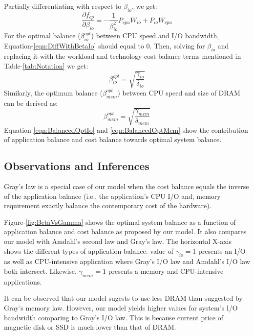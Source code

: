 \documentclass[journal]{IEEEtran}
\begin{document}
Partially differentiating with respect to $\beta_{io}$, we get:
\begin{equation} \label{eqn:DiffWithBetaIo}
\frac{\partial f_{cp}}{\partial \beta_{io}} = -\frac{1}{\beta_{io}^2}P_{cpu}W_{io} + P_{io}W_{cpu}
\end{equation}
For the optimal balance ($\beta_{io}^{opt}$) between CPU speed and I/O bandwidth, Equation-\ref{eqn:DiffWithBetaIo} should equal to $0$. Then,  solving for $\beta_{io}$ and replacing it with the workload and technology-cost balance terms mentioned in Table-\ref{tab:Notation} we get:
\begin{equation} \label{eqn:BalancedOptIo}
\beta^{opt}_{io} = \sqrt{\frac{\gamma_{io}}{\delta_{io}}}
\end{equation}
Similarly, the optimum balance ($\beta_{mem}^{opt}$) between CPU speed and size of DRAM can be derived as: 
\begin{equation} \label{eqn:BalancedOptMem}
\beta^{opt}_{mem} = \sqrt{\frac{\gamma_{mem}}{\delta_{mem}}}
\end{equation}
Equation-\ref{eqn:BalancedOptIo} and \ref{eqn:BalancedOptMem} show the contribution of application balance and cost balance towards  optimal system balance. 

\subsection{Observations and Inferences}
Gray's law is a special case of our model when the cost balance equals the inverse of the application balance (i.e., the application's CPU  I/O and, memory requirement exactly balance the contemporary cost of the hardware).

Figure-\ref{fig:BetaVsGamma} shows the optimal system balance as a function of application balance and cost balance as proposed by our model. It also compares our model with Amdahl's second law and Gray's law. The horizontal X-axis shows the different types of application balance. value of $\gamma_{io}=1$  presents an I/O as well as CPU-intensive application where Gray's I/O law and Amdahl's I/O law both intersect. Likewise, $\gamma_{mem}=1$ presents a memory and CPU-intensive applications. 

It can be observed that our model sugests to use less DRAM than suggested by Gray's memory law. However, our model yields higher values for system's I/O bandwidth comparing to Gray's I/O law. This is because current price of magnetic disk or SSD is much lower than that of DRAM. 
\end{document}
